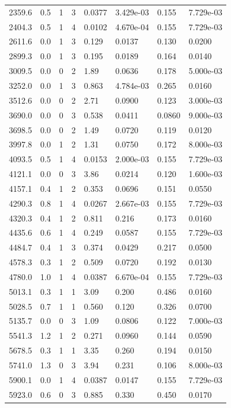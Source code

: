 \documentclass[preview]{standalone}
\begin{document}
{{\begin{tabular}{L{1.2cm}C{1.2cm} C{0.3cm}C{0.5cm} C{1.4cm}C{1.4cm} C{1.4cm}C{1.4cm}}
  2359.6  &   0.5  & 1     &  3 &  0.0377  & 3.429e-03  & 0.155 &  7.729e-03   \\ 
  2404.3  &   0.5  & 1     &  4 &  0.0102  & 4.670e-04  & 0.155 &  7.729e-03   \\ 
  2611.6  &   0.0  & 1     &  3 &  0.129  & 0.0137  & 0.130 &  0.0200   \\ 
  2899.3  &   0.0  & 1     &  3 &  0.195  & 0.0189  & 0.164 &  0.0140   \\ 
  3009.5  &   0.0  & 0     &  2 &  1.89  & 0.0636  & 0.178 &  5.000e-03   \\ 
  3252.0  &   0.0  & 1     &  3 &  0.863  & 4.784e-03  & 0.265 &  0.0160   \\ 
  3512.6  &   0.0  & 0     &  2 &  2.71  & 0.0900  & 0.123 &  3.000e-03   \\ 
  3690.0  &   0.0  & 0     &  3 &  0.538  & 0.0411  & 0.0860 &  9.000e-03   \\ 
  3698.5  &   0.0  & 0     &  2 &  1.49  & 0.0720  & 0.119 &  0.0120   \\ 
  3997.8  &   0.0  & 1     &  2 &  1.31  & 0.0750  & 0.172 &  8.000e-03   \\ 
  4093.5  &   0.5  & 1     &  4 &  0.0153  & 2.000e-03  & 0.155 &  7.729e-03   \\ 
  4121.1  &   0.0  & 0     &  3 &  3.86  & 0.0214  & 0.120 &  1.600e-03   \\ 
  4157.1  &   0.4  & 1     &  2 &  0.353  & 0.0696  & 0.151 &  0.0550   \\ 
  4290.3  &   0.8  & 1     &  4 &  0.0267  & 2.667e-03  & 0.155 &  7.729e-03   \\ 
  4320.3  &   0.4  & 1     &  2 &  0.811  & 0.216  & 0.173 &  0.0160   \\ 
  4435.6  &   0.6  & 1     &  4 &  0.249  & 0.0587  & 0.155 &  7.729e-03   \\ 
  4484.7  &   0.4  & 1     &  3 &  0.374  & 0.0429  & 0.217 &  0.0500   \\ 
  4578.3  &   0.3  & 1     &  2 &  0.509  & 0.0720  & 0.192 &  0.0130   \\ 
  4780.0  &   1.0  & 1     &  4 &  0.0387  & 6.670e-04  & 0.155 &  7.729e-03   \\ 
  5013.1  &   0.3  & 1     &  1 &  3.09  & 0.200  & 0.486 &  0.0160   \\ 
  5028.5  &   0.7  & 1     &  1 &  0.560  & 0.120  & 0.326 &  0.0700   \\ 
  5135.7  &   0.0  & 0     &  3 &  1.09  & 0.0806  & 0.122 &  7.000e-03   \\ 
  5541.3  &   1.2  & 1     &  2 &  0.271  & 0.0960  & 0.144 &  0.0590   \\ 
  5678.5  &   0.3  & 1     &  1 &  3.35  & 0.260  & 0.194 &  0.0150   \\ 
  5741.0  &   1.3  & 0     &  3 &  3.94  & 0.231  & 0.106 &  8.000e-03   \\ 
  5900.1  &   0.0  & 1     &  4 &  0.0387  & 0.0147  & 0.155 &  7.729e-03   \\ 
  5923.0  &   0.6  & 0     &  3 &  0.885  & 0.330  & 0.450 &  0.0170   \\ 
\hline 
\end{tabular} 

}}
\end{document}
